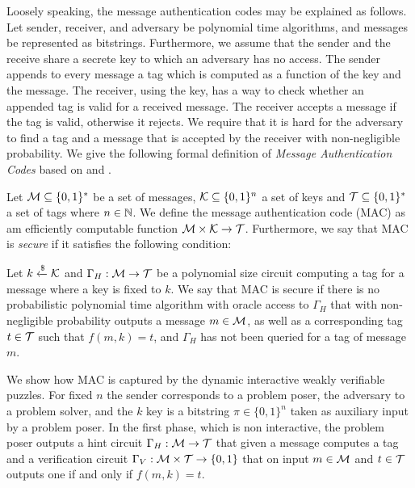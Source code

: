 \documentclass[11pt,a4paper,titlepage]{memoir}
\begin{document}
Loosely speaking, the message authentication codes may be explained as follows.
Let sender, receiver, and adversary be polynomial time algorithms, and messages be represented as bitstrings.
Furthermore, we assume that the sender and the receive share a secrete key to which an adversary has no access.
The sender appends to every message a tag which is computed as a function of the key and the message.
The receiver, using the key, has a way to check whether an appended tag is valid for a received message.
The receiver accepts a message if the tag is valid, otherwise it rejects.
We require that it is hard for the adversary to find a tag and a message that is accepted by the receiver with non-negligible probability.
We give the following formal definition of \textit{Message Authentication Codes} based on \cite{LectureNotesCrypo} and \cite{Goldreich:2004:FCV:975541}.
\begin{definition}
  Let $\mathcal{M} \subseteq \{0,1\}^*$ be a set of messages, $\mathcal{K} \subseteq \{0,1\}^{n}$ a set of keys and $\mathcal{T} \subseteq \{0,1\}^*$ a set of tags where $n \in \mathbb{N}$.
  We define the \textnormal{message authentication code (MAC)} as am efficiently computable function $\mathcal{M} \times \mathcal{K} \rightarrow \mathcal{T}$.
  Furthermore, we say that MAC is \textit{secure} if it satisfies the following condition:

  Let $k \xleftarrow{\$} \mathcal{K}$ and $\Gamma_H: \mathcal{M} \rightarrow \mathcal{T}$ be a polynomial size circuit computing
  a tag for a message where a key is fixed to $k$. We say that MAC is secure if there is no probabilistic polynomial time algorithm with oracle access to $\Gamma_H$
  that with non-negligible probability outputs a message $m \in \mathcal{M}$, as well as a corresponding tag $t \in \mathcal{T}$ such that $f(m, k) = t$,
  and $\Gamma_H$ has not been queried for a tag of message $m$.

\end{definition}
%
We show how MAC is captured by the dynamic interactive weakly verifiable puzzles.
For fixed $n$ the sender corresponds to a problem poser, the adversary to a problem solver, and
the $k$ key is a bitstring $\pi \in \{0,1\}^{n}$ taken as auxiliary input by a problem poser.
In the first phase, which is non interactive, the problem poser outputs a hint circuit
$\Gamma_H: \mathcal{M} \rightarrow \mathcal{T}$ that given a message computes a tag
and a verification circuit $\Gamma_V: \mathcal{M} \times \mathcal{T} \rightarrow \{0,1\}$ that on input $m \in \mathcal{M}$ and $t \in \mathcal{T}$
outputs one if and only if $f(m, k) = t$.
\end{document}
